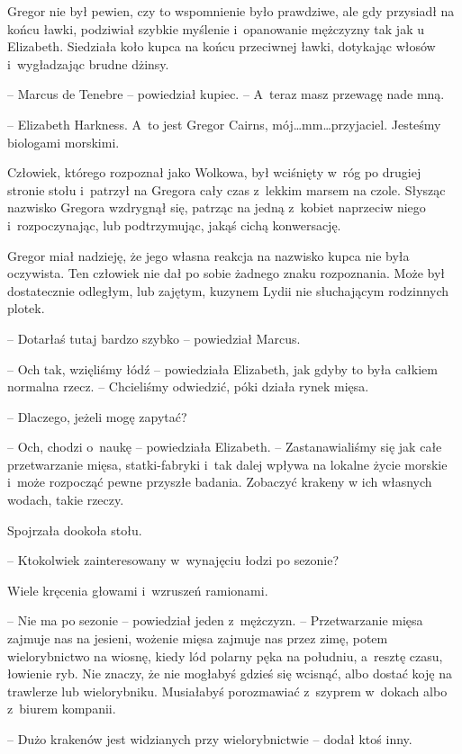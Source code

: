 \documentclass[oneside,polish,12pt,sfheadings]{mwbk}
\begin{document}
Gregor nie był pewien, czy to wspomnienie było prawdziwe, ale gdy
przysiadł na końcu ławki, podziwiał szybkie myślenie i~opanowanie
mężczyzny tak jak u Elizabeth. Siedziała koło kupca na końcu przeciwnej
ławki, dotykając włosów i~wygładzając brudne dżinsy.

-- Marcus de Tenebre -- powiedział kupiec. -- A~teraz masz przewagę nade
mną.

-- Elizabeth Harkness. A~to jest Gregor Cairns, mój\ldots mm\ldots przyjaciel.
Jesteśmy biologami morskimi.

Człowiek, którego rozpoznał jako Wolkowa, był wciśnięty w~róg po drugiej
stronie stołu i~patrzył na Gregora cały czas z~lekkim marsem na czole.
Słysząc nazwisko Gregora wzdrygnął się, patrząc na jedną z~kobiet
naprzeciw niego i~rozpoczynając, lub podtrzymując, jakąś cichą
konwersację.

Gregor miał nadzieję, że jego własna reakcja na nazwisko kupca nie była
oczywista. Ten człowiek nie dał po sobie żadnego znaku rozpoznania. Może
był dostatecznie odległym, lub zajętym, kuzynem Lydii nie słuchającym
rodzinnych plotek.

-- Dotarłaś tutaj bardzo szybko -- powiedział Marcus.

-- Och tak, wzięliśmy łódź -- powiedziała Elizabeth, jak gdyby to była
całkiem normalna rzecz. -- Chcieliśmy odwiedzić, póki działa rynek mięsa.

-- Dlaczego, jeżeli mogę zapytać?

-- Och, chodzi o~naukę -- powiedziała Elizabeth. -- Zastanawialiśmy się jak
całe przetwarzanie mięsa, statki-fabryki i~tak dalej wpływa na lokalne
życie morskie i~może rozpocząć pewne przyszłe badania. Zobaczyć krakeny
w ich własnych wodach, takie rzeczy.

Spojrzała dookoła stołu. 

-- Ktokolwiek zainteresowany w~wynajęciu łodzi
po sezonie?

Wiele kręcenia głowami i~wzruszeń ramionami.

-- Nie ma po sezonie -- powiedział jeden z~mężczyzn. -- Przetwarzanie mięsa
zajmuje nas na jesieni, wożenie mięsa zajmuje nas przez zimę, potem
wielorybnictwo na wiosnę, kiedy lód polarny pęka na południu, a~resztę
czasu, łowienie ryb. Nie znaczy, że nie mogłabyś gdzieś się wcisnąć,
albo dostać koję na trawlerze lub wielorybniku. Musiałabyś porozmawiać z~szyprem w~dokach albo z~biurem kompanii.

-- Dużo krakenów jest widzianych przy wielorybnictwie -- dodał ktoś inny.
\end{document}
